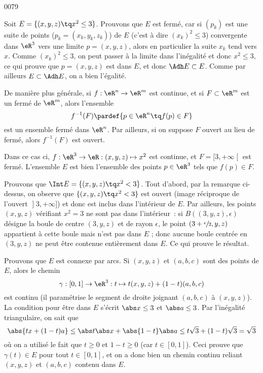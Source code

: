 
\begin{corrige}{0079}


Soit $E = \{ (x,y,z) \tq x^2 \leq 3\}$. Prouvons que $E$ est
fermé, car si $(p_k)$ est une suite de points ($p_k = (x_k,y_k,z_k)$)
de $E$ (c'est à dire $(x_k)^2 \leq 3$) convergente dans $\eR^3$ vers une limite
$p = (x,y,z)$, alors en particulier la suite $x_k$ tend vers
$x$. Comme $(x_k)^2 \leq 3$, on peut passer à la limite dans
l'inégalité et donc $x^2 \leq 3$, ce qui prouve que $p = (x,y,z)$ est
dans $E$, et donc $\Adh E \subset E$. Comme par ailleurs $E \subset
\Adh E$, on a bien l'égalité.

\begin{remark}
  De manière plus générale, si $f : \eR^n \to \eR^m$ est continue,
  et si $F \subset \eR^m$ est un fermé de $\eR^m$, alors l'ensemble
  \begin{equation*}
    f^{-1}(F) \pardef \{ p \in\eR^n \tq f(p) \in F \}
  \end{equation*}
  est un ensemble fermé dans $\eR^n$. Par ailleurs, si on suppose $F$
  ouvert au lieu de fermé, alors $f^{-1}(F)$ est ouvert.

  Dans ce cas ci, $f : \eR^3 \to \eR : (x,y,z) \mapsto x^2$ est
  continue, et $F = \mathopen[3,+\infty\mathclose[$ est
  fermé. L'ensemble $E$ est bien l'ensemble des points $p \in \eR^3$
  tels que $f(p) \in F$.
\end{remark}

Prouvons que $\Int E = \{ (x,y,z) \tq x^2 < 3\}$. Tout
d'abord, par la remarque ci-dessus, on observe que $\{ (x,y,z) \tq
x^2 < 3\}$ est ouvert (image réciproque de l'ouvert
$\mathopen]3,+\infty\mathclose]$) et donc est inclus dans l'intérieur
de $E$. Par ailleurs, les points $(x,y,z)$ vérifiant $x^2 = 3$ ne sont
pas dans l'intérieur~: si $B((3,y,z),\epsilon)$ désigne la boule de
centre $(3,y,z)$ et de rayon $\epsilon$, le point
$(3+\sfrac\epsilon2,y,z)$ appartient à cette boule mais n'est pas dans
$E$ ; donc aucune boule centrée en $(3,y,z)$ ne peut être contenue
entièrement dans $E$. Ce qui prouve le résultat.

Prouvons que $E$ est connexe par arcs. Si $(x,y,z)$ et $(a,b,c)$ sont
des points de $E$, alors le chemin
\begin{equation*}
  \gamma : [0,1] \to \eR^3 : t \mapsto t (x,y,z) + (1-t) (a,b,c)
\end{equation*}
est continu (il paramétrise le segment de droite joignant $(a,b,c)$ à
$(x,y,z)$). La condition pour être dans $E$ s'écrit $\abs x \leq 3$ et
$\abs a \leq 3$. Par l'inégalité triangulaire, on sait que
\begin{equation*}
  \abs{tx+(1-t)a} \leq \abs t \abs x + \abs{1-t} \abs a \leq t \sqrt3
  + (1-t) \sqrt 3 = \sqrt 3
\end{equation*}
où on a utilisé le fait que $t \geq 0$ et $1-t \geq 0$ (car $t \in
[0,1]$). Ceci prouve que $\gamma(t) \in E$ pour tout $t \in [0,1]$, et
on a donc bien un chemin continu reliant $(x,y,z)$ et $(a,b,c)$
contenu dans $E$.

\end{corrige}

